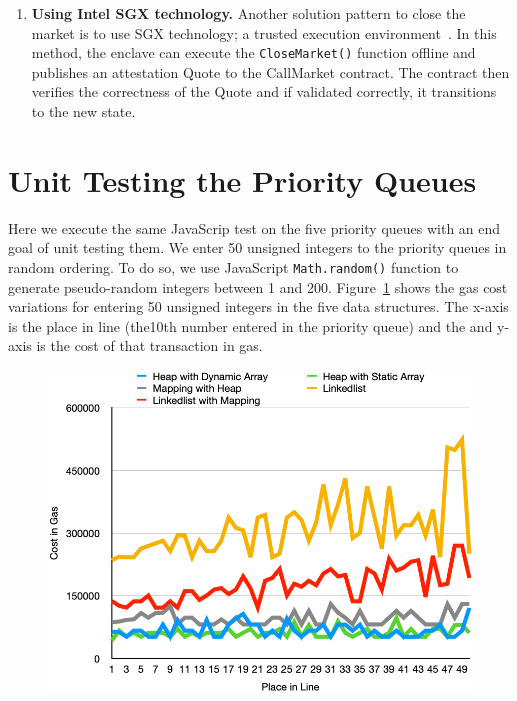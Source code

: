 \begin{enumerate}
\begin{itemize}
\end{itemize}

\item \textbf{{Using Intel SGX technology.}} Another solution pattern to close the market is to use SGX technology; a trusted execution environment~\cite{anati2013innovative}. In this method, the enclave can execute the \texttt{CloseMarket()} function offline and publishes an attestation Quote to the CallMarket contract. The contract then verifies the correctness of the Quote and if validated correctly, it transitions to the new state.


\end{enumerate}






\section{Unit Testing the Priority Queues}

Here we execute the same JavaScrip test on the five priority queues with an end goal of unit testing them. We enter 50 unsigned integers to the priority queues in random ordering. To do so, we use JavaScript \texttt{Math.random()} function to generate pseudo-random integers between 1 and 200. Figure~\ref{fig:average_uints_insertion} shows the gas cost variations for entering 50 unsigned integers in the five data structures. The x-axis is the place in line (\eg the10th number entered in the priority queue) and the and y-axis is the cost of that transaction in gas. 


\begin{figure}[htb!p]
\centering
\includegraphics[width=1\textwidth]{fig/average_uints_insertion.png}
\caption{\footnotesize{}  \label{fig:average_uints_insertion}}
\end{figure}

